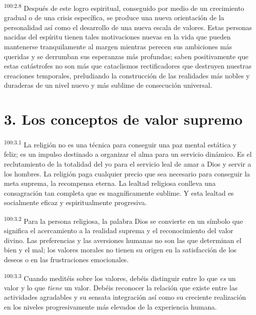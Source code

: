 \par
\textsuperscript{100:2.8} Después de este logro espiritual, conseguido por medio de un crecimiento gradual o de una crisis específica, se produce una nueva orientación de la personalidad así como el desarrollo de una nueva escala de valores. Estas personas nacidas del espíritu tienen tales motivaciones nuevas en la vida que pueden mantenerse tranquilamente al margen mientras perecen sus ambiciones más queridas y se derrumban sus esperanzas más profundas; saben positivamente que estas catástrofes no son más que cataclismos rectificadores que destruyen nuestras creaciones temporales, preludiando la construcción de las realidades más nobles y duraderas de un nivel nuevo y más sublime de consecución universal.

\section*{3. Los conceptos de valor supremo}
\par
\textsuperscript{100:3.1} La religión no es una técnica para conseguir una paz mental estática y feliz; es un impulso destinado a organizar el alma para un servicio dinámico. Es el reclutamiento de la totalidad del yo para el servicio leal de amar a Dios y servir a los hombres. La religión paga cualquier precio que sea necesario para conseguir la meta suprema, la recompensa eterna. La lealtad religiosa conlleva una consagración tan completa que es magníficamente sublime. Y esta lealtad es socialmente eficaz y espiritualmente progresiva.

\par
\textsuperscript{100:3.2} Para la persona religiosa, la palabra Dios se convierte en un símbolo que significa el acercamiento a la realidad suprema y el reconocimiento del valor divino. Las preferencias y las aversiones humanas no son las que determinan el bien y el mal; los valores morales no tienen su origen en la satisfacción de los deseos o en las frustraciones emocionales.

\par
\textsuperscript{100:3.3} Cuando meditéis sobre los valores, debéis distinguir entre lo que \textit{es} un valor y lo que \textit{tiene} un valor. Debéis reconocer la relación que existe entre las actividades agradables y su sensata integración así como su creciente realización en los niveles progresivamente más elevados de la experiencia humana.

